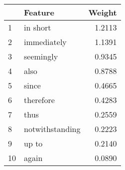 \begin{tabular}{llr}
\toprule
{} &          Feature &  Weight \\
\midrule
1  &         in short &  1.2113 \\
2  &      immediately &  1.1391 \\
3  &        seemingly &  0.9345 \\
4  &             also &  0.8788 \\
5  &            since &  0.4665 \\
6  &        therefore &  0.4283 \\
7  &             thus &  0.2559 \\
8  &  notwithstanding &  0.2223 \\
9  &            up to &  0.2140 \\
10 &            again &  0.0890 \\
\bottomrule
\end{tabular}
